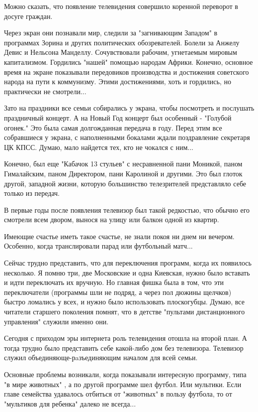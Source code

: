 Можно сказать, что появление телевидения совершило коренной переворот в досуге
граждан.

Через экран они познавали мир, следили за "загнивающим Западом" в программах
Зорина и других политических обозревателей. Болели за Анжелу Девис и Нельсона
Манделлу. Сочувствовали рабочим, угнетаемым мировым капитализмом. Гордились
"нашей" помощью народам Африки. Конечно, основное время на экране показывали
передовиков производства и достижения советского народа на пути к коммунизму.
Этими достижениями, хоть и гордились, но практически не смотрели...

Зато на праздники все семьи собирались у экрана, чтобы посмотреть и послушать
праздничный концерт. А на Новый Год концерт был особенный - "Голубой огонек."
Это была самая долгожданная  передача в году. Перед этим все собравшиеся у
экрана, с наполненными бокалами ждали поздравление секретаря ЦК КПСС. Думаю,
мало найдется тех, кто не чокался с ним... 

Конечно, был еще "Кабачок 13 стульев" с несравненной пани Моникой, паном
Гималайским, паном Директором, пани Каролиной и другими.  Это  был глоток
другой, западной жизни, которую большинство телезрителей представляло себе
только из передач. 

В первые годы после появления телевизор был такой редкостью, что обычно его
смотрели всем двором, вынося на улицу или балкон одной из квартир.

Имеющие счастье иметь такое счастье, не знали покоя ни днем ни вечером.
Особенно, когда транслировали парад или футбольный матч...

Сейчас трудно представить, что для переключения программ, когда их появилось
несколько. Я помню три,  две Московские и одна Киевская, нужно было вставать и
идти переключать их вручную. Но главная фишка была в том, что эти переключатели
(программы шли не  подряд, а через пол дюжины щелчков) быстро ломались у всех,
и нужно было использовать плоскогубцы. Думаю, все читатели старшего поколения
помнят, что в детстве "пультами дистанционного управления" служили именно они.

Сегодня с приходом эры интернета роль телевидения отошла на второй план. А
тогда трудно было представить себе какой-либо дом без телевизора. Телевизор
служил объединяюще-рaзъединяющим началом для всей семьи.

Основные проблемы возникали, когда показывали интересную программу, типа "в
мире животных" , а по другой программе шел футбол. Или мультики. Если главе
семейства удавалось отбиться от "животных" в пользу футбола, то от "мультиков
для ребенка" далеко не всегда...

